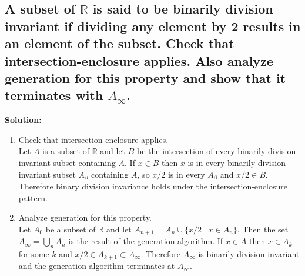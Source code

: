 \documentclass{article}
\newcommand{\exercise}[1]{\subsection{\normalfont #1}}
\newcommand{\solution}{\indent\indent \textbf{Solution: }}
\begin{document}
\exercise{A subset of $\mathbb{R}$ is said to be binarily division invariant if dividing any element by 2 results in an element of the subset. Check that intersection-enclosure applies. Also analyze generation for this property and show that it terminates with $A_\infty$.}
\solution
\begin{enumerate}
\item Check that intersection-enclosure applies. \\
Let $A$ is a subset of $\mathbb{R}$ and let $B$ be the intersection of every binarily division invariant subset containing $A$. If $x\in B$ then $x$ is in every binarily division invariant subset $A_\beta$ containing $A$, so $x/2$ is in every $A_\beta$ and $x/2 \in B$. Therefore binary division invariance holds under the intersection-enclosure pattern.  
\item Analyze generation for this property. \\
Let $A_0$ be a subset of $\mathbb{R}$ and let $A_{n+1} = A_n \cup \{x/2 \mid x \in A_n\}$. Then the set $A_\infty = \bigcup_n A_n$ is the result of the generation algorithm. If $x \in A$ then $x \in A_k$ for some $k$ and $x/2 \in A_{k+1} \subset A_\infty$. Therefore $A_\infty$ is binarily division invariant and the generation algorithm terminates at $A_\infty$.
\end{enumerate}
\end{document}
